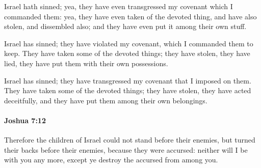 			\begin{versebox}
					\item[BHS] 
					\item[ASV] Israel hath sinned; yea, they have even transgressed my covenant which I commanded them: yea, they have even taken of the devoted thing, and have also stolen, and dissembled also; and they have even put it among their own stuff.
					\item[NIV] Israel has sinned; they have violated my covenant, which I commanded them to keep. They have taken some of the devoted things; they have stolen, they have lied, they have put them with their own possessions.
					\item[NRSV] Israel has sinned; they have transgressed my covenant that I imposed on them. They have taken some of the devoted things; they have stolen, they have acted deceitfully, and they have put them among their own belongings.
			\end{versebox}

		\paragraph{Joshua 7:12} %
			\label{JOSHUA-7-12}

			Therefore the children of Israel could not stand before their enemies, but turned their backs before their enemies, because they were accursed: neither will I be with you any more, except ye destroy the accursed from among you.

